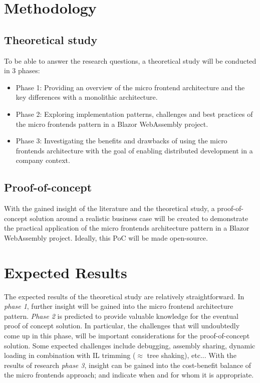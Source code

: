
\section{Methodology}
\label{sec:methodology}

\subsection{Theoretical study}
To be able to answer the research questions, a theoretical study will be
conducted in 3 phases:
\begin{itemize}
    \item Phase 1: Providing an overview of the micro frontend architecture and
    the key differences with a monolithic architecture.
    \item Phase 2: Exploring implementation patterns, challenges and best
    practices of the micro frontends pattern in a Blazor WebAssembly project.
    \item Phase 3: Investigating the benefits and drawbacks of using the micro
    frontends architecture with the goal of enabling distributed development in
    a company context.
\end{itemize}

\subsection{Proof-of-concept}
With the gained insight of the literature and the theoretical study, a
proof-of-concept solution around a realistic business case will be created to
demonstrate the practical application of the micro frontends architecture
pattern in a Blazor WebAssembly project. Ideally, this PoC will be made
open-source.




\section{Expected Results}
\label{sec:expected-results}

The expected results of the theoretical study are relatively straightforward. In
\textit{phase 1}, further insight will be gained into the micro frontend
architecture pattern. \textit{Phase 2} is predicted to provide valuable
knowledge for the eventual proof of concept solution. In particular, the
challenges that will undoubtedly come up in this phase, will be important
considerations for the proof-of-concept solution. Some expected challenges
include debugging, assembly sharing, dynamic loading in combination with IL
trimming ($\approx$ tree shaking), etc... With the results of research
\textit{phase 3}, insight can be gained into the cost-benefit balance of the
micro frontends approach; and indicate when and for whom it is appropriate. 

